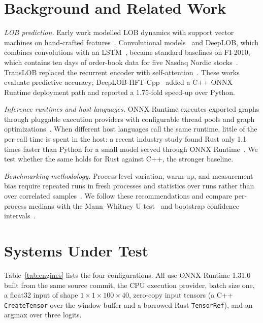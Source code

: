 \documentclass[conference]{IEEEtran}
\begin{document}
\section{Background and Related Work}

\textit{LOB prediction.} Early work modelled LOB dynamics with support vector machines on hand-crafted features~\cite{kercheval2015svm}. Convolutional models~\cite{tsantekidis2017cnn} and DeepLOB, which combines convolutions with an LSTM~\cite{zhang2019deeplob}, became standard baselines on FI-2010, which contains ten days of order-book data for five Nasdaq Nordic stocks~\cite{ntakaris2018fi2010}. TransLOB replaced the recurrent encoder with self-attention~\cite{wallbridge2020translob,vaswani2017attention}. These works evaluate predictive accuracy; DeepLOB-HFT-Cpp~\cite{prashant2026deeplobhft} added a C++ ONNX Runtime deployment path and reported a 1.75-fold speed-up over Python.

\textit{Inference runtimes and host languages.} ONNX Runtime executes exported graphs through pluggable execution providers with configurable thread pools and graph optimizations~\cite{onnxruntime}. When different host languages call the same runtime, little of the per-call time is spent in the host: a recent industry study found Rust only 1.1 times faster than Python for a small model served through ONNX Runtime~\cite{qdrant2026oxidizing}. We test whether the same holds for Rust against C++, the stronger baseline.

\textit{Benchmarking methodology.} Process-level variation, warm-up, and measurement bias require repeated runs in fresh processes and statistics over runs rather than over correlated samples~\cite{georges2007rigorous,kalibera2013rigorous,hoefler2015scientific,mytkowicz2009wrong}. We follow these recommendations and compare per-process medians with the Mann--Whitney U test~\cite{mann1947test} and bootstrap confidence intervals~\cite{efron1993bootstrap}.

\section{Systems Under Test}

Table~\ref{tab:engines} lists the four configurations. All use ONNX Runtime 1.31.0 built from the same source commit, the CPU execution provider, batch size one, a float32 input of shape $1\times1\times100\times40$, zero-copy input tensors (a C++ \texttt{CreateTensor} over the window buffer and a borrowed Rust \texttt{TensorRef}), and an argmax over three logits.
\end{document}
